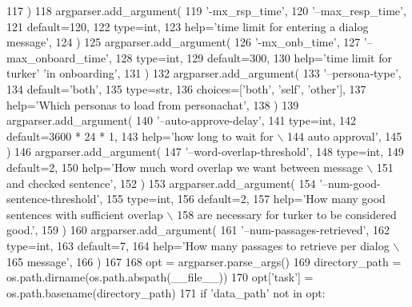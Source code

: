 \begin{DoxyCode}
117     )
118     argparser.add\_argument(
119         \textcolor{stringliteral}{'-mx\_rsp\_time'},
120         \textcolor{stringliteral}{'--max\_resp\_time'},
121         default=120,
122         type=int,
123         help=\textcolor{stringliteral}{'time limit for entering a dialog message'},
124     )
125     argparser.add\_argument(
126         \textcolor{stringliteral}{'-mx\_onb\_time'},
127         \textcolor{stringliteral}{'--max\_onboard\_time'},
128         type=int,
129         default=300,
130         help=\textcolor{stringliteral}{'time limit for turker'} \textcolor{stringliteral}{'in onboarding'},
131     )
132     argparser.add\_argument(
133         \textcolor{stringliteral}{'--persona-type'},
134         default=\textcolor{stringliteral}{'both'},
135         type=str,
136         choices=[\textcolor{stringliteral}{'both'}, \textcolor{stringliteral}{'self'}, \textcolor{stringliteral}{'other'}],
137         help=\textcolor{stringliteral}{'Which personas to load from personachat'},
138     )
139     argparser.add\_argument(
140         \textcolor{stringliteral}{'--auto-approve-delay'},
141         type=int,
142         default=3600 * 24 * 1,
143         help=\textcolor{stringliteral}{'how long to wait for  \(\backslash\)}
144 \textcolor{stringliteral}{                           auto approval'},
145     )
146     argparser.add\_argument(
147         \textcolor{stringliteral}{'--word-overlap-threshold'},
148         type=int,
149         default=2,
150         help=\textcolor{stringliteral}{'How much word overlap we want between message \(\backslash\)}
151 \textcolor{stringliteral}{                           and checked sentence'},
152     )
153     argparser.add\_argument(
154         \textcolor{stringliteral}{'--num-good-sentence-threshold'},
155         type=int,
156         default=2,
157         help=\textcolor{stringliteral}{'How many good sentences with sufficient overlap \(\backslash\)}
158 \textcolor{stringliteral}{                           are necessary for turker to be considered good.'},
159     )
160     argparser.add\_argument(
161         \textcolor{stringliteral}{'--num-passages-retrieved'},
162         type=int,
163         default=7,
164         help=\textcolor{stringliteral}{'How many passages to retrieve per dialog \(\backslash\)}
165 \textcolor{stringliteral}{                           message'},
166     )
167 
168     opt = argparser.parse\_args()
169     directory\_path = os.path.dirname(os.path.abspath(\_\_file\_\_))
170     opt[\textcolor{stringliteral}{'task'}] = os.path.basename(directory\_path)
171     \textcolor{keywordflow}{if} \textcolor{stringliteral}{'data\_path'} \textcolor{keywordflow}{not} \textcolor{keywordflow}{in} opt:

\end{DoxyCode}
